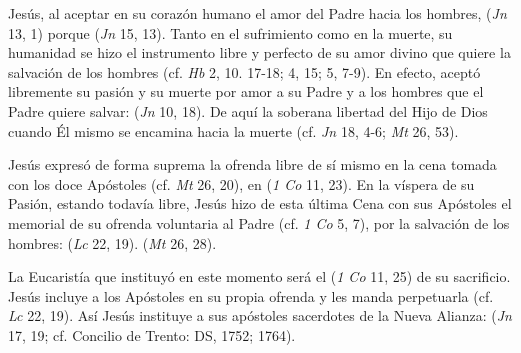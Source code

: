 \begin{ccebody}

 Jesús, al aceptar en su corazón humano el amor del Padre hacia los hombres,  (\textit{Jn} 13, 1) porque  (\textit{Jn} 15, 13). Tanto en el sufrimiento como en la muerte, su humanidad se hizo el instrumento libre y perfecto de su amor divino que quiere la salvación de los hombres (cf. \textit{Hb }2, 10. 17-18; 4, 15; 5, 7-9). En efecto, aceptó libremente su pasión y su muerte por amor a su Padre y a los hombres que el Padre quiere salvar:  (\textit{Jn} 10, 18). De aquí la soberana libertad del Hijo de Dios cuando Él mismo se encamina hacia la muerte (cf. \textit{Jn} 18, 4-6; \textit{Mt} 26, 53).


 Jesús expresó de forma suprema la ofrenda libre de sí mismo en la cena tomada con los doce Apóstoles (cf. \textit{Mt} 26, 20), en  (\textit{1 Co} 11, 23). En la víspera de su Pasión, estando todavía libre, Jesús hizo de esta última Cena con sus Apóstoles el memorial de su ofrenda voluntaria al Padre (cf. \textit{1 Co} 5, 7), por la salvación de los hombres:  (\textit{Lc} 22, 19).  (\textit{Mt} 26, 28).

 La Eucaristía que instituyó en este momento será el  (\textit{1 Co} 11, 25) de su sacrificio. Jesús incluye a los Apóstoles en su propia ofrenda y les manda perpetuarla (cf. \textit{Lc} 22, 19). Así Jesús instituye a sus apóstoles sacerdotes de la Nueva Alianza:  (\textit{Jn} 17, 19; cf. Concilio de Trento: DS, 1752; 1764).



\end{ccebody}
